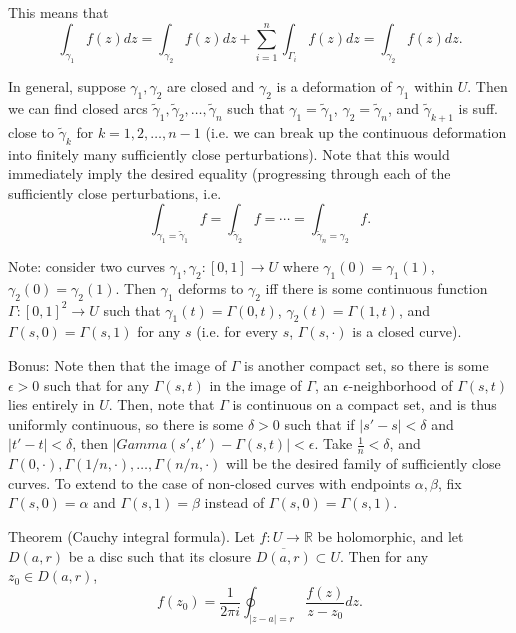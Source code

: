 \documentclass{artikel3}
\newcommand{\abs}[1]{\left|#1\right|}
\newcommand{\alt}[1]{\tilde{#1}}
\newcommand{\complex}{\mathbb{R}}
\begin{document}
This means that \[
	\int_{\gamma_1}f(z)dz = \int_{\gamma_2}f(z)dz+\sum_{i=1}^{n}\int_{\Gamma_i}f(z)dz
		= \int_{\gamma_2}f(z)dz.
\]

In general, suppose $\gamma_1,\gamma_2$ are closed and $\gamma_2$ is a deformation
of $\gamma_1$ within $U$.  Then we can find closed arcs $\alt{\gamma}_1,\alt{\gamma}_2,\ldots,\alt{\gamma}_n$
such that $\gamma_1=\alt{\gamma}_1$, $\gamma_2=\alt{\gamma}_n$, and $\alt{\gamma}_{k+1}$
is suff. close to $\alt{\gamma}_k$ for $k=1,2,\ldots,n-1$ (i.e. we can break up the continuous deformation
into finitely many sufficiently close perturbations).  Note that this would immediately
imply the desired equality (progressing through each of the sufficiently close perturbations,
i.e. \[
	\int_{\gamma_1=\alt{\gamma}_1}f = \int_{\alt{\gamma}_2}f=\cdots =\int_{\alt{\gamma}_n=\gamma_2}f.
\]

Note: consider two curves $\gamma_1,\gamma_2:[0,1]\to U$ where $\gamma_1(0)=\gamma_1(1)$,
$\gamma_2(0)=\gamma_2(1)$.  Then $\gamma_1$ deforms to $\gamma_2$ iff there is some continuous
function $\Gamma:[0,1]^2\to U$ such that $\gamma_1(t)=\Gamma(0,t)$, $\gamma_2(t)=\Gamma(1,t)$,
and $\Gamma(s,0)=\Gamma(s,1)$ for any $s$ (i.e. for every $s$, $\Gamma(s,\cdot)$ is a closed curve).

Bonus: Note then that the image of $\Gamma$ is another compact set, so there is some $\epsilon>0$ such
that for any $\Gamma(s,t)$ in the image of $\Gamma$, an $\epsilon$-neighborhood of $\Gamma(s,t)$
lies entirely in $U$.  Then, note that $\Gamma$ is continuous on a compact set, and is thus uniformly
continuous, so there is some $\delta>0$ such that if $\abs{s'-s}<\delta$ and $\abs{t'-t}<\delta$,
then $\abs{Gamma(s',t')-\Gamma(s,t)}<\epsilon$.  Take $\frac{1}{n}<\delta$, and $\Gamma(0,\cdot),\Gamma(1/n,\cdot),\ldots,\Gamma(n/n,\cdot)$
will be the desired family of sufficiently close curves.  To extend to the case of non-closed curves
with endpoints $\alpha,\beta$, fix $\Gamma(s,0)=\alpha$ and $\Gamma(s,1)=\beta$ instead of
$\Gamma(s,0)=\Gamma(s,1)$.

Theorem (Cauchy integral formula).  Let $f:U\to\complex$ be holomorphic, and let $D(a,r)$
be a disc such that its closure $\overline{D(a,r)}\subset U$.  Then for any $z_0\in D(a,r)$, \[
	f(z_0)=\frac{1}{2\pi i}\oint_{\abs{z-a}=r}\frac{f(z)}{z-z_0}dz.
\]
\end{document}
